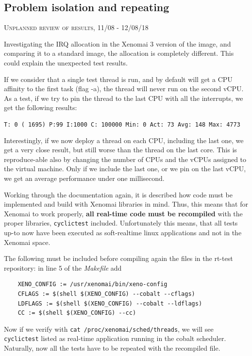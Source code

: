 \documentclass[]{scrartcl}
\begin{document}
\subsection{Problem isolation and repeating}
\label{sec:isol}

{\small\textsc{Unplanned review of results, 11/08 - 12/08/18} \bigskip}

Investigating the IRQ allocation in the Xenomai 3 version of the image, and comparing it to a standard image, the allocation is completely different. This could explain the unexpected test results.

If we consider that a single test thread is run, and by default will get a CPU affinity to the first task (flag -a), the thread will never run on the second vCPU. As a test, if we try to pin the thread to the last CPU with all the interrupts, we get the following results:

\noindent \small \texttt{T: 0 ( 1695) P:99 I:1000 C: 100000 Min:      0 Act:   73 Avg:  148 Max:    4773}

Interestingly, if we now deploy a thread on each CPU, including the last one, we get a very close result, but still worse than the thread on the last core. This is reproduce-able also by changing the number of CPUs and the vCPUs assigned to the virtual machine. Only if we include the last one, or we pin on the last vCPU, we get an average performance under one millisecond.

Working through the documentation again, it is described how code must be implemented and build with Xenomai libraries in mind. Thus, this means that for Xenomai to work properly, \textbf{all real-time code must be recompiled} with the proper libraries, \texttt{cyclictest} included. Unfortunately this means, that all tests up-to now have been executed as soft-realtime linux applications and not in the Xenomai space.

The following must be included before compiling again the files in the rt-test repository: in line 5 of the \textit{Makefile} add

\begin{verbatim}
	XENO_CONFIG := /usr/xenomai/bin/xeno-config
	CFLAGS := $(shell $(XENO_CONFIG) --cobalt --cflags)
	LDFLAGS := $(shell $(XENO_CONFIG) --cobalt --ldflags)
	CC := $(shell $(XENO_CONFIG) --cc)
\end{verbatim}

Now if we verify with \texttt{cat /proc/xenomai/sched/threads}, we will see \texttt{cyclictest} listed as real-time application running in the cobalt scheduler.
Naturally, now all the tests have to be repeated with the recompiled file.
\end{document}

